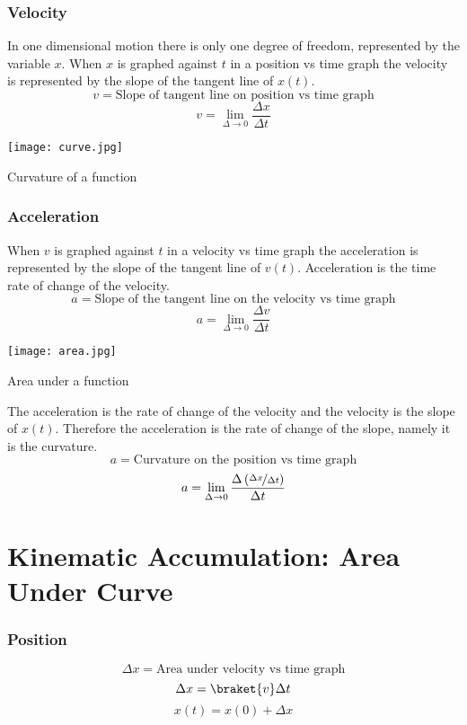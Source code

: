 \subsubsection{Velocity}
In one dimensional motion there is only one degree of freedom, represented by the variable $x$.  When $x$ is graphed against $t$ in a position vs time graph the velocity is represented by the slope of the tangent line of $x(t)$.
$$v=\text{Slope of tangent line on position vs time graph}$$
$$v=\lim_{\Delta \rightarrow 0}\frac{\Delta x}{ \Delta t}$$
\begin{marginfigure}[40pt]%
  \texttt{[image: curve.jpg]}
  \caption{Curvature of a function}
  \label{fig:marginfig}
\end{marginfigure}
\subsubsection{Acceleration}

When $v$ is graphed against $t$ in a velocity vs time graph the acceleration is represented by the slope of the tangent line of $v(t)$.  Acceleration is the time rate of change of the velocity.
$$a=\text{Slope of the tangent line on the velocity vs time graph}$$
$$a=\lim_{\Delta \rightarrow 0}\frac{\Delta v}{ \Delta t}$$
\begin{marginfigure}[60pt]%
  \texttt{[image: area.jpg]}
  \caption{Area under a function}
  \label{fig:marginfig}
\end{marginfigure}
The acceleration is the rate of change of the velocity and the velocity is the slope of $x(t)$.  Therefore the acceleration is the rate of change of the slope, namely it is the curvature.
$$a=\text{Curvature on the position vs time graph}$$
$$a=\lim_{\Delta \rightarrow 0}\frac{\Delta \left( \nicefrac{\Delta x}{\Delta t}\right)}{ \Delta t}$$

\section{Kinematic Accumulation: Area Under Curve}
\subsubsection{Position}
$$\Delta x=\text{Area under velocity vs time graph}$$
$$\Delta x=\braket{v} \Delta t$$
$$x(t)=x(0)+\Delta x$$

